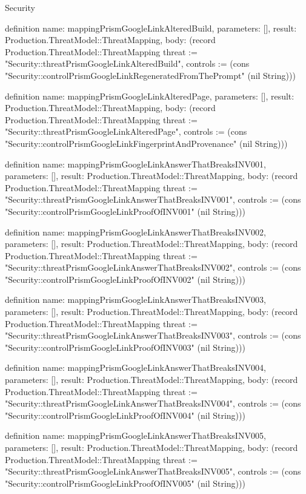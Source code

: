 \begin{lexlean}{Security}
\begin{semanticmodule}
definition{
  name: mappingPrismGoogleLinkAlteredBuild,
  parameters: [],
  result: Production.ThreatModel::ThreatMapping,
  body: (record Production.ThreatModel::ThreatMapping {threat := "Security::threatPrismGoogleLinkAlteredBuild", controls := (cons "Security::controlPrismGoogleLinkRegeneratedFromThePrompt" (nil String))})
}

definition{
  name: mappingPrismGoogleLinkAlteredPage,
  parameters: [],
  result: Production.ThreatModel::ThreatMapping,
  body: (record Production.ThreatModel::ThreatMapping {threat := "Security::threatPrismGoogleLinkAlteredPage", controls := (cons "Security::controlPrismGoogleLinkFingerprintAndProvenance" (nil String))})
}

definition{
  name: mappingPrismGoogleLinkAnswerThatBreaksINV001,
  parameters: [],
  result: Production.ThreatModel::ThreatMapping,
  body: (record Production.ThreatModel::ThreatMapping {threat := "Security::threatPrismGoogleLinkAnswerThatBreaksINV001", controls := (cons "Security::controlPrismGoogleLinkProofOfINV001" (nil String))})
}

definition{
  name: mappingPrismGoogleLinkAnswerThatBreaksINV002,
  parameters: [],
  result: Production.ThreatModel::ThreatMapping,
  body: (record Production.ThreatModel::ThreatMapping {threat := "Security::threatPrismGoogleLinkAnswerThatBreaksINV002", controls := (cons "Security::controlPrismGoogleLinkProofOfINV002" (nil String))})
}

definition{
  name: mappingPrismGoogleLinkAnswerThatBreaksINV003,
  parameters: [],
  result: Production.ThreatModel::ThreatMapping,
  body: (record Production.ThreatModel::ThreatMapping {threat := "Security::threatPrismGoogleLinkAnswerThatBreaksINV003", controls := (cons "Security::controlPrismGoogleLinkProofOfINV003" (nil String))})
}

definition{
  name: mappingPrismGoogleLinkAnswerThatBreaksINV004,
  parameters: [],
  result: Production.ThreatModel::ThreatMapping,
  body: (record Production.ThreatModel::ThreatMapping {threat := "Security::threatPrismGoogleLinkAnswerThatBreaksINV004", controls := (cons "Security::controlPrismGoogleLinkProofOfINV004" (nil String))})
}

definition{
  name: mappingPrismGoogleLinkAnswerThatBreaksINV005,
  parameters: [],
  result: Production.ThreatModel::ThreatMapping,
  body: (record Production.ThreatModel::ThreatMapping {threat := "Security::threatPrismGoogleLinkAnswerThatBreaksINV005", controls := (cons "Security::controlPrismGoogleLinkProofOfINV005" (nil String))})
}


\end{semanticmodule}
\end{lexlean}
